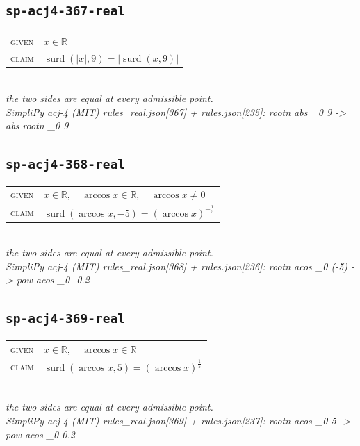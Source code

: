\documentclass[11pt]{article}
\begin{document}
\subsection*{\texttt{sp-acj4-367-real}}
\begin{tabular}{@{}l@{\quad}l@{}}
\textsc{given} & $x \in \mathbb{R}$ \\[4pt]
\textsc{claim} & $\displaystyle \operatorname{surd}\left(\left|x\right|, 9\right) = \left|\operatorname{surd}\left(x, 9\right)\right|$ \\
\end{tabular}\\[2pt]
{\small\emph{the two sides are equal at every admissible point.}}\\
\emph{SimpliPy acj-4 (MIT) rules\_real.json[367] + rules.json[235]: rootn abs \_0 9  ->  abs rootn \_0 9}\\

\subsection*{\texttt{sp-acj4-368-real}}
\begin{tabular}{@{}l@{\quad}l@{}}
\textsc{given} & $x \in \mathbb{R},\quad \arccos x \in \mathbb{R},\quad \arccos x \neq 0$ \\[4pt]
\textsc{claim} & $\displaystyle \operatorname{surd}\left(\arccos x, -5\right) = \left(\arccos x\right)^{-\frac{1}{5}}$ \\
\end{tabular}\\[2pt]
{\small\emph{the two sides are equal at every admissible point.}}\\
\emph{SimpliPy acj-4 (MIT) rules\_real.json[368] + rules.json[236]: rootn acos \_0 (-5)  ->  pow acos \_0 -0.2}\\

\subsection*{\texttt{sp-acj4-369-real}}
\begin{tabular}{@{}l@{\quad}l@{}}
\textsc{given} & $x \in \mathbb{R},\quad \arccos x \in \mathbb{R}$ \\[4pt]
\textsc{claim} & $\displaystyle \operatorname{surd}\left(\arccos x, 5\right) = \left(\arccos x\right)^{\frac{1}{5}}$ \\
\end{tabular}\\[2pt]
{\small\emph{the two sides are equal at every admissible point.}}\\
\emph{SimpliPy acj-4 (MIT) rules\_real.json[369] + rules.json[237]: rootn acos \_0 5  ->  pow acos \_0 0.2}\\
\end{document}
